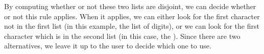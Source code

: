    By computing whether or not these two lists are disjoint, we can decide whether or not this rule applies.  When it applies, we can either look for the first character not in the first list (in this example, the list of digits), or we can look for the first character which is in the second list (in this case, the \terminal{+}).  Since there are two alternatives, we leave it up to the user to decide which one to use.
%
%
%
%
%  
%  
%
%
